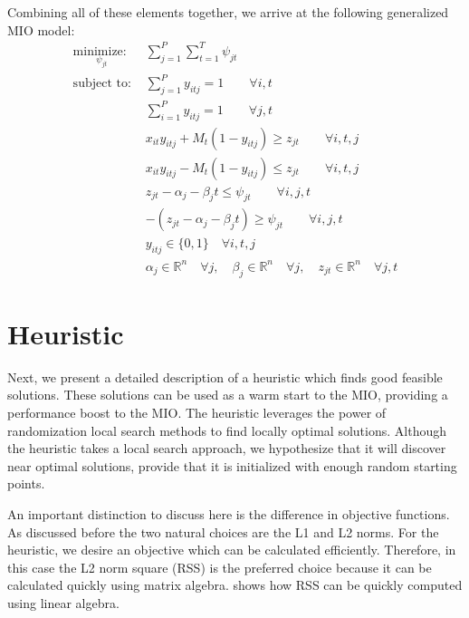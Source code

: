 \documentclass[journal]{IEEEtran}
\begin{document}
Combining all of these elements together, we arrive at the following generalized MIO model:
\begin{align*}
\underset{\psi_{jt}}{\text{minimize: }} & \sum_{j=1}^{P} \sum_{t=1}^{T} \psi_{jt} \\
\text{subject to: }	& \sum_{j=1}^{P} y_{itj} = 1 \qquad \forall i,t\\
				& \sum_{i=1}^{P} y_{itj} = 1 \qquad \forall j,t\\
				& x_{it}y_{itj} + M_{t}(1-y_{itj}) \geq z_{jt} \qquad \forall i,t,j\\
				& x_{it}y_{itj} - M_{t}(1-y_{itj}) \leq z_{jt} \qquad \forall i,t,j\\
				& z_{jt} - \alpha_{j} - \beta_{j}t \leq \psi_{jt} \qquad \forall i,j,t\\
				& -(z_{jt} - \alpha_{j} - \beta_{j}t) \geq \psi_{jt} \qquad \forall i,j,t\\
			 	& y_{itj} \in \{0,1\} \quad \forall i,t,j\\
				& \alpha_{j} \in \mathbb{R}^n \quad \forall j,\quad \beta_{j} \in \mathbb{R}^n \quad \forall j, \quad z_{jt} \in \mathbb{R}^n \quad \forall j,t
\end{align*}

\section{Heuristic} \label{sec:Heuristic}
Next, we present a detailed description of a heuristic which finds good feasible solutions. These solutions can be used as a warm start to the MIO, providing a performance boost to the MIO. The heuristic leverages the power of randomization local search methods to find locally optimal solutions. Although the heuristic takes a local search approach, we hypothesize that it will discover near optimal solutions, provide that it is initialized with enough random starting points.

An important distinction to discuss here is the difference in objective functions. As discussed before the two natural choices are the L1 and L2 norms. For the heuristic, we desire an objective which can be calculated efficiently. Therefore, in this case the L2 norm square (RSS) is the preferred choice because it can be calculated quickly using matrix algebra. \cite{RSS-Matrix} shows how RSS can be quickly computed using linear algebra.
\end{document}
